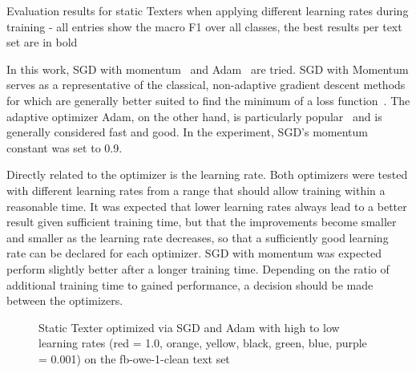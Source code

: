 
\begin{table}[t]
    \centering
    
    \caption{Evaluation results for static Texters when applying different learning rates during training - all entries show the macro F1 over all classes, the best results per text set are in bold}
    \label{tab:5_experiments/4_texter/2_static/8_optimizer/grid_search}
\end{table}

In this work, SGD with momentum~\cite{Qian1999OnTM} and Adam~\cite{Kingma2015AdamAM} are tried. SGD with Momentum serves as a representative of the classical, non-adaptive gradient descent methods for which are generally better suited to find the minimum of a loss function~\cite{Wilson2017TheMV}. The adaptive optimizer Adam, on the other hand, is particularly popular~\cite{AdamPopular} and is generally considered fast and good. In the experiment, SGD's momentum constant was set to 0.9.

Directly related to the optimizer is the learning rate. Both optimizers were tested with different learning rates from a range that should allow training within a reasonable time. It was expected that lower learning rates always lead to a better result given sufficient training time, but that the improvements become smaller and smaller as the learning rate decreases, so that a sufficiently good learning rate can be declared for each optimizer. SGD with momentum was expected perform slightly better after a longer training time. Depending on the ratio of additional training time to gained performance, a decision should be made between the optimizers.

\begin{figure}[t]
    \centering
    
    \caption{Static Texter optimized via SGD and Adam with high to low learning rates (red = 1.0, orange, yellow, black, green, blue, purple = 0.001) on the fb-owe-1-clean text set}
    \label{fig:5_experiments/4_texter/2_static/8_optimizer/sgd_vs_adam/sgd_vs_adam}
\end{figure}

